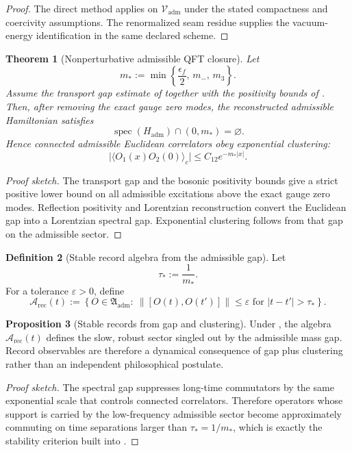\documentclass[11pt,a4paper]{article}
\newtheorem{theorem}{Theorem}[section]
\theoremstyle{definition}
\newtheorem{definition}[theorem]{Definition}
\newtheorem{proposition}[theorem]{Proposition}
\theoremstyle{remark}
\newcommand{\Arec}{\mathcal A_{\mathrm{rec}}}
\newcommand{\Vadm}{\mathcal V_{\mathrm{adm}}}
\begin{document}
\begin{proof}
The direct method applies on $\Vadm$ under the stated compactness and coercivity
assumptions. The renormalized seam residue supplies the vacuum-energy
identification in the same declared scheme.
\end{proof}

\begin{theorem}[Nonperturbative admissible QFT closure]
\label{thm:nonperturbative-admissible-qft}
Let
\[
m_*:=\min\left\{\frac{\epsilon_f}{2},\,m_-,\,m_3\right\}.
\]
Assume the transport gap estimate of  together with the positivity bounds of . Then, after removing the exact gauge zero modes, the reconstructed admissible Hamiltonian satisfies
\[
\operatorname{spec}(H_{\mathrm{adm}})\cap(0,m_*)=\varnothing.
\]
Hence connected admissible Euclidean correlators obey exponential clustering:
\[
\bigl|\langle O_1(x)O_2(0)\rangle_c\bigr|
\le
C_{12}e^{-m_*|x|}.
\]
\end{theorem}

\begin{proof}[Proof sketch]
The transport gap and the bosonic positivity bounds give a strict positive lower bound on all admissible excitations above the exact gauge zero modes. Reflection positivity and Lorentzian reconstruction convert the Euclidean gap into a Lorentzian spectral gap. Exponential clustering follows from that gap on the admissible sector.
\end{proof}

\begin{definition}[Stable record algebra from the admissible gap]
\label{def:stable-record-algebra}
Let
\[
\tau_*:=\frac{1}{m_*}.
\]
For a tolerance $\varepsilon>0$, define
\[
\Arec(t)
:=
\left\{
O\in\mathfrak A_{\mathrm{adm}}
:\ \|[O(t),O(t')]\|\le\varepsilon
\text{ for } |t-t'|>\tau_*
\right\}.
\]
\end{definition}

\begin{proposition}[Stable records from gap and clustering]
Under , the algebra $\Arec(t)$ defines the slow, robust sector singled out by the admissible mass gap. Record observables are therefore a dynamical consequence of gap plus clustering rather than an independent philosophical postulate.
\end{proposition}

\begin{proof}[Proof sketch]
The spectral gap suppresses long-time commutators by the same exponential scale that controls connected correlators. Therefore operators whose support is carried by the low-frequency admissible sector become approximately commuting on time separations larger than $\tau_*=1/m_*$, which is exactly the stability criterion built into .
\end{proof}
\end{document}
